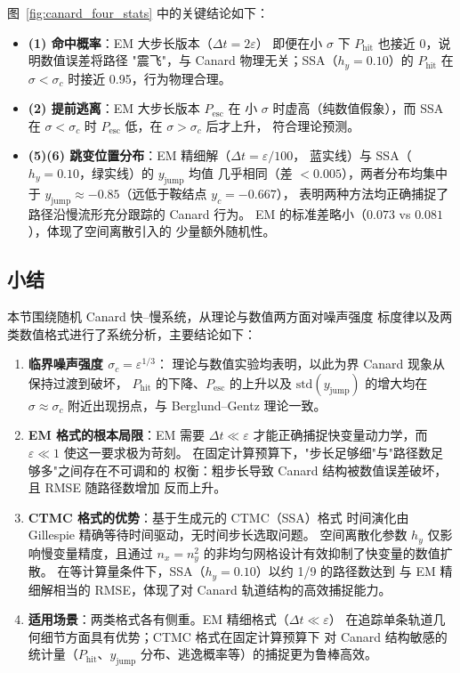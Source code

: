 图~\ref{fig:canard_four_stats} 中的关键结论如下：

\begin{itemize}
	\item \textbf{(1) 命中概率}：EM 大步长版本（$\Delta t = 2\varepsilon$）
	即便在小 $\sigma$ 下 $P_\mathrm{hit}$ 也接近 0，说明数值误差将路径
	"震飞"，与 Canard 物理无关；SSA（$h_y=0.10$）的 $P_\mathrm{hit}$
	在 $\sigma < \sigma_c$ 时接近 0.95，行为物理合理。
	
	\item \textbf{(2) 提前逃离}：EM 大步长版本 $P_\mathrm{esc}$ 在
	小 $\sigma$ 时虚高（纯数值假象），而 SSA 在 $\sigma < \sigma_c$
	时 $P_\mathrm{esc}$ 低，在 $\sigma > \sigma_c$ 后才上升，
	符合理论预测。
	
	\item \textbf{(5)(6) 跳变位置分布}：EM 精细解（$\Delta t=\varepsilon/100$，
	蓝实线）与 SSA（$h_y=0.10$，绿实线）的 $y_\mathrm{jump}$ 均值
	几乎相同（差 $<0.005$），两者分布均集中于
	$y_\mathrm{jump} \approx -0.85$（远低于鞍结点 $y_c=-0.667$），
	表明两种方法均正确捕捉了路径沿慢流形充分跟踪的 Canard 行为。
	EM 的标准差略小（$0.073$ vs $0.081$），体现了空间离散引入的
	少量额外随机性。
\end{itemize}

\subsection{小结}
\label{subsec:canard-summary}

本节围绕随机 Canard 快--慢系统，从理论与数值两方面对噪声强度
标度律以及两类数值格式进行了系统分析，主要结论如下：

\begin{enumerate}
	\item \textbf{临界噪声强度 $\sigma_c = \varepsilon^{1/3}$}：
	理论与数值实验均表明，以此为界 Canard 现象从保持过渡到破坏，
	$P_\mathrm{hit}$ 的下降、$P_\mathrm{esc}$ 的上升以及
	$\mathrm{std}(y_\mathrm{jump})$ 的增大均在 $\sigma \approx \sigma_c$
	附近出现拐点，与 Berglund--Gentz 理论一致。
	
	\item \textbf{EM 格式的根本局限}：EM 需要 $\Delta t \ll \varepsilon$
	才能正确捕捉快变量动力学，而 $\varepsilon \ll 1$ 使这一要求极为苛刻。
	在固定计算预算下，"步长足够细"与"路径数足够多"之间存在不可调和的
	权衡：粗步长导致 Canard 结构被数值误差破坏，且 RMSE 随路径数增加
	反而上升。
	
	\item \textbf{CTMC 格式的优势}：基于生成元的 CTMC（SSA）格式
	时间演化由 Gillespie 精确等待时间驱动，无时间步长选取问题。
	空间离散化参数 $h_y$ 仅影响慢变量精度，且通过 $n_x = n_y^2$
	的非均匀网格设计有效抑制了快变量的数值扩散。
	在等计算量条件下，SSA（$h_y=0.10$）以约 1/9 的路径数达到
	与 EM 精细解相当的 RMSE，体现了对 Canard 轨道结构的高效捕捉能力。
	
	\item \textbf{适用场景}：两类格式各有侧重。EM 精细格式（$\Delta t \ll \varepsilon$）
	在追踪单条轨道几何细节方面具有优势；CTMC 格式在固定计算预算下
	对 Canard 结构敏感的统计量（$P_\mathrm{hit}$、$y_\mathrm{jump}$
	分布、逃逸概率等）的捕捉更为鲁棒高效。
\end{enumerate}


